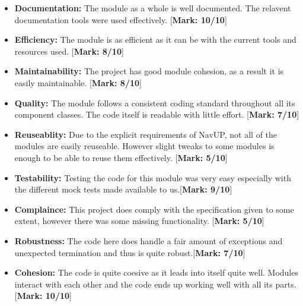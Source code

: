 \documentclass[runningheads,a4paper]{article}
\begin{document}
	\begin{itemize}
		\item \textbf{Documentation:}
			The module as a whole is well documented. The relavent documentation tools were used effectively. [\textbf{Mark: 10/10}]
			
		\item \textbf{Efficiency:} The module is as efficient as it can be with the current tools and resources used. [\textbf{Mark: 8/10}]
		
		\item \textbf{Maintainability:} The project has good module cohesion, as a result it is easily maintainable. [\textbf{Mark: 8/10}]
		
		\item \textbf{Quality:} The module follows a consistent coding standard throughout all its component classes. The code itself is readable with little effort. [\textbf{Mark: 7/10}]
		
		\item \textbf{Reuseablity:} Due to the explicit requirements of NavUP, not all of the modules are easily reuseable. However slight tweaks to some modules is enough to be able to reuse them effectively. [\textbf{Mark: 5/10}]
		
		\item \textbf{Testability:} Testing the code for this module was very easy especially with the different mock tests made available to us.[\textbf{Mark: 9/10}]
		
		\item \textbf{Complaince:} This project does comply with the specification given to some extent, however there was some missing functionality. [\textbf{Mark: 5/10}]
		
		\item \textbf{Robustness:} The code here does handle a fair amount of exceptions and unexpected termination and thus is quite robust.[\textbf{Mark: 7/10}]
		
		\item \textbf{Cohesion:} The code is quite coesive as it leads into itself quite well. Modules interact with each other and the code ends up working well with all its parts.[\textbf{Mark: 10/10}]\\
		
	\end{itemize}
\end{document}

